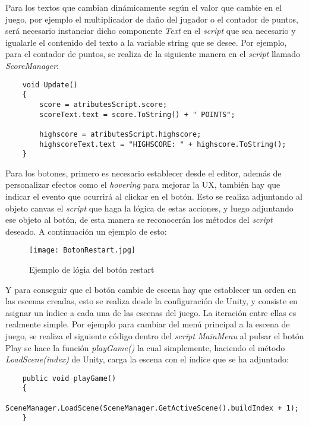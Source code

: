 Para los textos que cambian dinámicamente según el valor que cambie en el juego, por ejemplo el multiplicador de daño del jugador o el contador de puntos, será necesario instanciar dicho componente \textit{Text} en el \textit{script} que sea necesario y igualarle el contenido del texto a la variable string que se desee. Por ejemplo, para el contador de puntos, se realiza de la siguiente manera en el \textit{script} llamado \textit{ScoreManager}:


\begin{lstlisting}
    void Update()
    {
        score = atributesScript.score;
        scoreText.text = score.ToString() + " POINTS";

        highscore = atributesScript.highscore;
        highscoreText.text = "HIGHSCORE: " + highscore.ToString();
    }
\end{lstlisting}

Para los botones, primero es necesario establecer desde el editor, además de personalizar efectos como el \textit{hovering} para mejorar la UX, también hay que indicar el evento que ocurrirá al clickar en el botón. Esto se realiza adjuntando al objeto canvas el \textit{script} que haga la lógica de estas acciones, y luego adjuntando ese objeto al botón, de esta manera se reconocerán los métodos del \textit{script} deseado. A continuación un ejemplo de esto:

\begin{figure}[H]
    \centering
    \texttt{[image: BotonRestart.jpg]}
    \caption{Ejemplo de lógia del botón restart }
\end{figure}

Y para conseguir que el botón cambie de escena hay que establecer un orden en las escenas creadas, esto se realiza desde la configuración de Unity, y consiste en asignar un índice a cada una de las escenas del juego. La iteración entre ellas es realmente simple. Por ejemplo para cambiar del menú principal a la escena de juego, se realiza el siguiente código dentro del \textit{script} \textit{MainMenu} al pulsar el botón Play se hace la función \textit{playGame()} la cual simplemente, haciendo el método \textit{LoadScene(index)} de Unity, carga la escena con el índice que se ha adjuntado:

\begin{lstlisting}
    public void playGame()
    {
        SceneManager.LoadScene(SceneManager.GetActiveScene().buildIndex + 1);
    }
\end{lstlisting}

